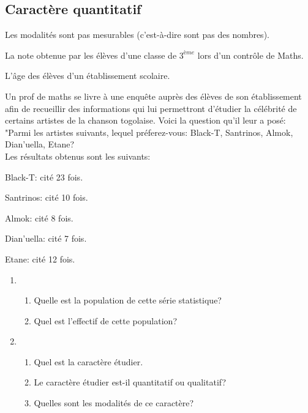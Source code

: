 \documentclass[12pt,a4paper]{report}
\begin{document}
\subsection{Caractère quantitatif}
Les modalités sont pas mesurables (c'est-à-dire sont pas des nombres).

\begin{exemples}
\item La note obtenue par les élèves d'une classe de $3^{ème}$ lors d'un contrôle de Maths.
\item L'âge des élèves d'un établissement scolaire.
\end{exemples}

\newpage
\newcommand{\A}{Black-T}
\newcommand{\B}{Santrinos}
\newcommand{\C}{Almok}
\newcommand{\D}{Dian'uella}
\newcommand{\E}{Etane}

\begin{exo}
Un prof de maths se livre à une enquête auprès des élèves de son établissement afin de recueillir des informations qui lui permettront d'étudier la célébrité de certains artistes de la chanson togolaise. Voici la question qu'il leur a posé: "Parmi les artistes suivants, lequel préferez-vous: \A, \B, \C, \D, \E?\\
Les résultats obtenus sont les suivants:

\begin{remslist}
\item \A : cité 23 fois.
\item \B : cité 10 fois.
\item \C : cité 8 fois.
\item \D : cité 7 fois.
\item \E : cité 12 fois.
\end{remslist}

\begin{enumerate}
\item \begin{enumerate}
\item Quelle est la population de cette série statistique?
\item Quel est l'effectif de cette population?
\end{enumerate}
\item \begin{enumerate}
\item Quel est la caractère étudier.
\item Le caractère étudier est-il quantitatif ou qualitatif?
\item Quelles sont les modalités de ce caractère?
\end{enumerate}
\end{enumerate}
\end{exo}
\end{document}
